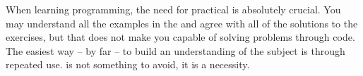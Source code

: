 When learning programming, the need for practical  is absolutely crucial. You may understand all the examples in the  and agree with all of the solutions to the exercises, but that does not make you capable of solving problems through code. The easiest way -- by far -- to build an understanding of the subject is through repeated use.  is not something to avoid, it is a necessity.

